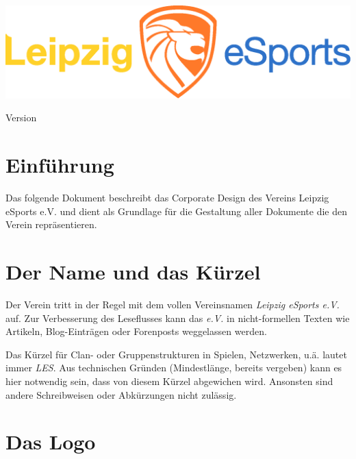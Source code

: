 \documentclass{article}
\begin{document}
\begin{titlepage}
\vspace*{\fill}
\title{\titel}
\author{\autor}
\includegraphics[width=\textwidth]{Docs/Logo.eps}
{\let\newpage\relax\maketitle}
\begin{center}
Version \version
\end{center}
\vspace*{\fill}
\end{titlepage}

\cleardoublepage

\tableofcontents

\cleardoublepage
\section{Einführung}

Das folgende Dokument beschreibt das Corporate Design des Vereins Leipzig eSports e.V. und dient als Grundlage für die Gestaltung aller Dokumente die den Verein repräsentieren.

\cleardoublepage
\section{Der Name und das Kürzel}

Der Verein tritt in der Regel mit dem vollen Vereinsnamen \emph{Leipzig eSports e.V.} auf. Zur Verbesserung des Leseflusses kann das \emph{e.V.} in nicht-formellen Texten wie Artikeln, Blog-Einträgen oder Forenposts weggelassen werden.

Das Kürzel für Clan- oder Gruppenstrukturen in Spielen, Netzwerken, u.ä. lautet immer \emph{LES}. Aus technischen Gründen (Mindestlänge, bereits vergeben) kann es hier notwendig sein, dass von diesem Kürzel abgewichen wird. Ansonsten sind andere Schreibweisen oder Abkürzungen nicht zulässig.

\cleardoublepage
\section{Das Logo}
\end{document}
